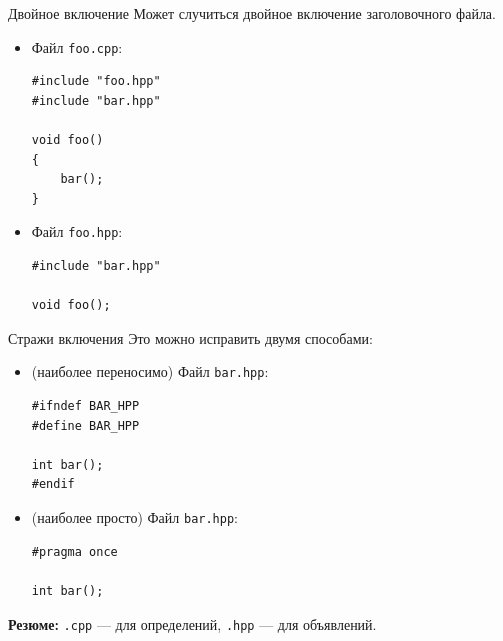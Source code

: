 \documentclass[aspectration=1610,t]{beamer}
\begin{document}
\begin{frame}[fragile]{Двойное включение}
Может случиться двойное включение заголовочного файла.
\begin{itemize}
    \item Файл {\tt foo.cpp}:
\begin{lstlisting}
#include "foo.hpp"
#include "bar.hpp"

void foo()
{
    bar();
}
\end{lstlisting}

    \item Файл {\tt foo.hpp}:
\begin{lstlisting}
#include "bar.hpp"

void foo();
\end{lstlisting}
\end{itemize}
\end{frame}

\begin{frame}[fragile]{Стражи включения}
Это можно исправить двумя способами:
\begin{itemize}
    \item (наиболее переносимо) Файл {\tt bar.hpp}:
\begin{lstlisting}
#ifndef BAR_HPP
#define BAR_HPP

int bar();
#endif
\end{lstlisting}
    \item (наиболее просто) Файл {\tt bar.hpp}: 
\begin{lstlisting}
#pragma once

int bar();
\end{lstlisting}
\end{itemize}
{\bf Резюме:} {\tt .cpp} — для определений, {\tt .hpp} — для объявлений.
\end{frame}
\end{document}
